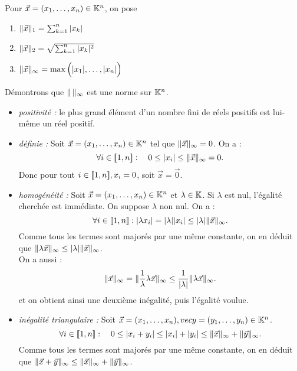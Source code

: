 \documentclass{book}
\begin{document}
\begin{Exemple}
Pour $\vec{x} =(x_1,\dots,x_n)\in \mathbb{K}^n$, on pose
\begin{enumerate}
\item $\mathopen\lVert \vec{x} \mathclose\rVert_1 = \sum_{k=1}^n |x_k|$
\item $\mathopen\lVert \vec{x} \mathclose\rVert_2 = \sqrt{\sum_{k=1}^n |x_k|^2}$
\item $\mathopen\lVert \vec{x} \mathclose\rVert_\infty = \max\Big(|x_1|,\dots,|x_n|\Big)$
\end{enumerate}
Démontrons que $\mathopen\lVert \, \mathclose\rVert_\infty$ est une norme sur $\mathbb{K}^n$. \\
\begin{itemize}
\item \textit{positivité :} le plus grand élément d'un nombre fini de réels positifs est lui-même un réel positif. 
\item \textit{définie :} Soit $\vec{x}=(x_1,\dots,x_n)\in \mathbb{K}^n$ tel que $\mathopen\lVert \vec{x} \mathclose\rVert_\infty=0$. On a :
 $$\forall i\in \mathopen\lbrack\!\lbrack1,n \mathclose\rbrack\!\rbrack :\quad  0\leq |x_i|\leq \mathopen\lVert \vec{x} \mathclose\rVert_\infty=0.$$ Donc pour tout $i\in\mathopen\lbrack\!\lbrack1,n \mathclose\rbrack\!\rbrack,x_i=0$, soit  $\vec{x}=\vec{0}$.
\item \textit{homogénéité :} Soit $\vec{x}=(x_1,\dots,x_n)\in \mathbb{K}^n$ et $\lambda\in\mathbb{K}$.  Si $\lambda$ est nul, l'égalité cherchée est immédiate. On suppose $\lambda$ non nul.
On a :
$$\forall i\in \mathopen\lbrack\!\lbrack1,n \mathclose\rbrack\!\rbrack : |\lambda x_i| = |\lambda| |x_i|\leq |\lambda| \mathopen\lVert \vec{x} \mathclose\rVert_\infty.$$ Comme tous les termes sont majorés par une même constante, on en déduit que  $  \mathopen\lVert \lambda\vec{x} \mathclose\rVert_\infty \leq |\lambda| \mathopen\lVert \vec{x} \mathclose\rVert_\infty$.\\
On a aussi :
$$\mathopen\lVert \vec{x} \mathclose\rVert_\infty=\mathopen\lVert \frac{1}{\lambda}\lambda\vec{x} \mathclose\rVert_\infty\leq \frac{1}{|\lambda|} \mathopen\lVert \lambda\vec{x} \mathclose\rVert_\infty.$$
 et on obtient ainsi une deuxième inégalité, puis l'égalité voulue. 
\item \textit{inégalité triangulaire :} Soit $\vec{x}=(x_1,\dots,x_n),vec{y}=(y_1,\dots,y_n)\in \mathbb{K}^n$.
$$\forall i\in \mathopen\lbrack\!\lbrack1,n \mathclose\rbrack\!\rbrack :\quad  0\leq |x_i+y_i|\leq |x_i|+|y_i|\leq \mathopen\lVert \vec{x} \mathclose\rVert_\infty +\mathopen\lVert \vec{y} \mathclose\rVert_\infty .$$ Comme tous les termes sont majorés par une même constante, on en déduit que  $  \mathopen\lVert \vec{x}+\vec{y} \mathclose\rVert_\infty \leq  \mathopen\lVert \vec{x} \mathclose\rVert_\infty+\mathopen\lVert \vec{y} \mathclose\rVert_\infty$.
\end{itemize}  

\end{Exemple}
\end{document}
